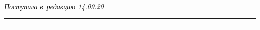 \vspace*{-3pt}





\hfill{\small\textit{Поступила в~редакцию 14.09.20}}














\vspace*{6pt}





\hrule





\vspace*{2pt}















\hrule





\vspace*{8pt}





\def\tit{MACHINE TRANSLATION: INDICATOR-BASED EVALUATION 


OF~TRAINING PROGRESS IN~NEURAL PROCESSING}





\def\titkol{Machine translation: Indicator-based evaluation 


of training progress in neural processing}











\def\aut{A.\,Yu.~Egorova, I.\,M.~Zatsman, M.\,G.~Kruzhkov, and 


V.\,A.~Nuriev }





\def\autkol{A.\,Yu.~Egorova, I.\,M.~Zatsman, M.\,G.~Kruzhkov, and 


V.\,A.~Nuriev}





